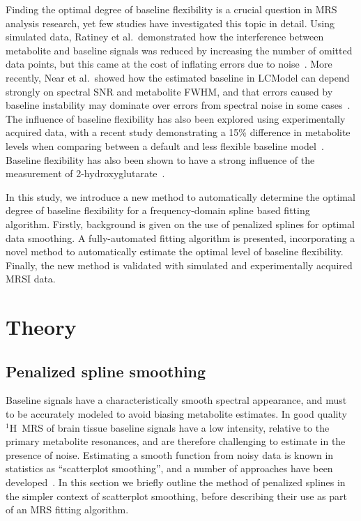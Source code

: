 \documentclass[num-refs]{wiley-article}
\newcommand{\proton}{\ensuremath{^1\mathrm{H}}}
\begin{document}
Finding the optimal degree of baseline flexibility is a crucial question in MRS analysis research, yet few studies have investigated this topic in detail. Using simulated data, Ratiney et al.\ demonstrated how the interference between metabolite and baseline signals was reduced by increasing the number of omitted data points, but this came at the cost of inflating errors due to noise~\cite{Ratiney2004}. More recently, Near et al.\ showed how the estimated baseline in LCModel can depend strongly on spectral SNR and metabolite FWHM, and that errors caused by baseline instability may dominate over errors from spectral noise in some cases~\cite{Near2013}. The influence of baseline flexibility has also been explored using experimentally acquired data, with a recent study demonstrating a 15\% difference in metabolite levels when comparing between a default and less flexible baseline model~\cite{Giapitzakis2019}. Baseline flexibility has also been shown to have a strong influence of the measurement of 2-hydroxyglutarate~\cite{Wenger2019}.

In this study, we introduce a new method to automatically determine the optimal degree of baseline flexibility for a frequency-domain spline based fitting algorithm. Firstly, background is given on the use of penalized splines for optimal data smoothing. A fully-automated fitting algorithm is presented, incorporating a novel method to automatically estimate the optimal level of baseline flexibility. Finally, the new method is validated with simulated and experimentally acquired MRSI data.

\section{Theory}
\subsection{Penalized spline smoothing}

Baseline signals have a characteristically smooth spectral appearance, and must to be accurately modeled to avoid biasing metabolite estimates. In good quality \proton\ MRS of brain tissue baseline signals have a low intensity, relative to the primary metabolite resonances, and are therefore challenging to estimate in the presence of noise. Estimating a smooth function from noisy data is known in statistics as ``scatterplot smoothing'', and a number of approaches have been developed~\cite{Ruppert2003}. In this section we briefly outline the method of penalized splines in the simpler context of scatterplot smoothing, before describing their use as part of an MRS fitting algorithm.
\end{document}
